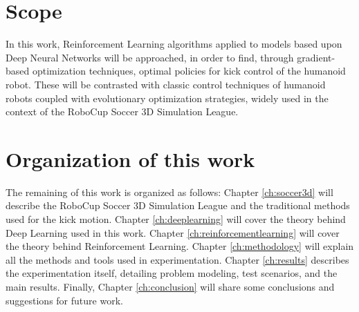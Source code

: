\section{Scope}

In this work, Reinforcement Learning algorithms applied to models based upon Deep Neural Networks will be approached, in order to find, through gradient-based optimization techniques, optimal policies for kick control of the humanoid robot. These will be contrasted with classic control techniques of humanoid robots coupled with evolutionary optimization strategies, widely used in the context of the RoboCup Soccer 3D Simulation League.

\section{Organization of this work}

The remaining of this work is organized as follows: Chapter \ref{ch:soccer3d} will describe the RoboCup Soccer 3D Simulation League and the traditional methods used for the kick motion. Chapter \ref{ch:deeplearning} will cover the theory behind Deep Learning used in this work. Chapter \ref {ch:reinforcementlearning} will cover the theory behind Reinforcement Learning. Chapter \ref{ch:methodology} will explain all the methods and tools used in experimentation. Chapter \ref{ch:results} describes the experimentation itself, detailing problem modeling, test scenarios, and the main results. Finally, Chapter \ref{ch:conclusion} will share some conclusions and suggestions for future work.

